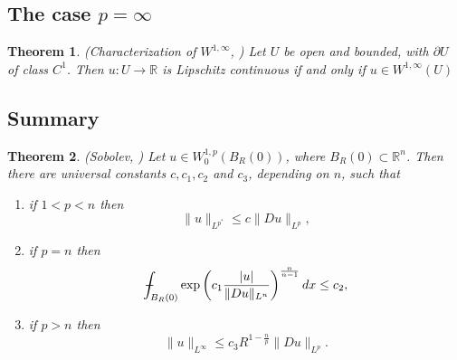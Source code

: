 \documentclass[11pt,a4paper]{report}
\newtheorem{theorem}{Theorem}[section]
\theoremstyle{definition}
\def\Xint#1{\mathchoice
{\XXint\displaystyle\textstyle{#1}}%
{\XXint\textstyle\scriptstyle{#1}}%
{\XXint\scriptstyle\scriptscriptstyle{#1}}%
{\XXint\scriptscriptstyle\scriptscriptstyle{#1}}%
\!\int}
\def\XXint#1#2#3{{\setbox0=\hbox{$#1{#2#3}{\int}$}
\vcenter{\hbox{$#2#3$}}\kern-.5\wd0}}
\def\dashint{\Xint-}
\begin{document}
\subsection{The case $p = \infty$}

\begin{theorem}
	\emph{(Characterization of $W^{1, \infty}$, \cite{2010_Evans})}
	Let $U$ be open and bounded, with $\partial U$ of class $C^1$. 
    Then $u: U \rightarrow \mathbb{R}$ is Lipschitz continuous if and only if $u \in W^{1, \infty}(U)$
\end{theorem}

\subsection{Summary}


\begin{theorem}
	\emph{(Sobolev, \cite[Theorem 7.29]{2012_Giaquinta})}
	Let $u \in W_0^{1, p}\left(B_R(0)\right)$, where $B_R(0) \subset \mathbb{R}^n$. Then there are universal constants $c, c_1, c_2$ and $c_3$, depending on $n$, such that
	\begin{enumerate}[label=(\alph*)] 
	\rm\item if $1<p<n$ then 
	\begin{equation*} 
		\|u\|_{L^{p^*}} \leq c\|D u\|_{L^p},
	\end{equation*}
	\rm\item if $p = n$ then 
	\begin{equation*} 
		\dashint_{B_R(0)} \exp \left(c_1 \frac{|u|}{\|D u\|_{L^n}}\right)^{\frac{n}{n-1}} d x \leq c_2,
	\end{equation*}
	\rm\item if $p>n$ then 
	\begin{equation*} 
		\|u\|_{L^{\infty}} \leq c_3 R^{1-\frac{n}{p}}\|D u\|_{L^p}.
	\end{equation*}
	\end{enumerate}
\end{theorem}





{}
\end{document}
